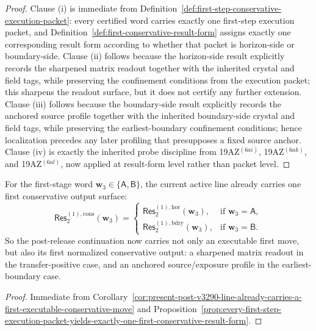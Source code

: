 \begin{proof}
Clause (i) is immediate from Definition~\ref{def:first-step-conservative-execution-packet}: every certified word carries exactly one first-step execution packet, and Definition~\ref{def:first-conservative-result-form} assigns exactly one corresponding result form according to whether that packet is horizon-side or boundary-side. Clause (ii) follows because the horizon-side result explicitly records the sharpened matrix readout together with the inherited crystal and field tags, while preserving the confinement conditions from the execution packet; this sharpens the readout surface, but it does not certify any further extension. Clause (iii) follows because the boundary-side result explicitly records the anchored source profile together with the inherited boundary-side crystal and field tags, while preserving the earliest-boundary confinement conditions; hence localization precedes any later profiling that presupposes a fixed source anchor. Clause (iv) is exactly the inherited probe discipline from 19AZ$^{(6ai)}$, 19AZ$^{(6ak)}$, and 19AZ$^{(6al)}$, now applied at result-form level rather than packet level.
\end{proof}

\begin{corollary}
\label{cor:present-post-v3290-line-already-carries-a-first-conservative-output-surface}
For the first-stage word \(\mathbf w_3\in\{\mathsf A,\mathsf B\}\), the current active line already carries one first conservative output surface:
\[
  \mathsf{Res}^{(1),\mathrm{cons}}_{2}(\mathbf w_3)
  =
  \begin{cases}
    \mathsf{Res}^{(1),\mathrm{hor}}_{2}(\mathbf w_3), & \text{if }\mathbf w_3=\mathsf A,\\[2mm]
    \mathsf{Res}^{(1),\mathrm{bdry}}_{2}(\mathbf w_3), & \text{if }\mathbf w_3=\mathsf B.
  \end{cases}
\]
So the post-release continuation now carries not only an executable first move, but also its first normalized conservative output: a sharpened matrix readout in the transfer-positive case, and an anchored source/exposure profile in the earliest-boundary case.
\end{corollary}

\begin{proof}
Immediate from Corollary~\ref{cor:present-post-v3290-line-already-carries-a-first-executable-conservative-move} and Proposition~\ref{prop:every-first-step-execution-packet-yields-exactly-one-first-conservative-result-form}.
\end{proof}


